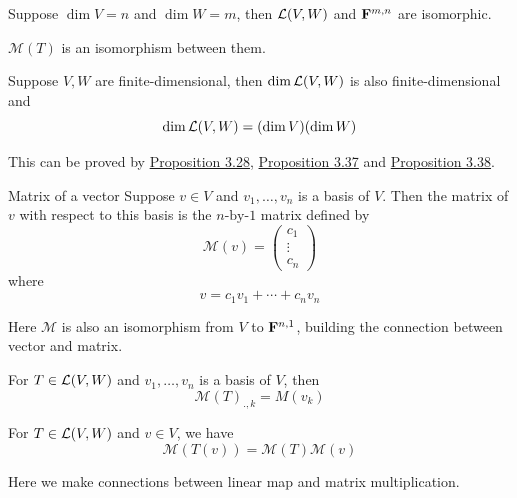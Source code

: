 \documentclass[12pt,a4paper]{article}
\begin{document}
    \begin{prop}\label{3.38}
        Suppose $\dim V=n$ and $\dim W=m$, then $\mathcal{L}(V,W)$ and $\mathbf{F}^{m,n}$ are isomorphic.
    \end{prop}
    \begin{remark}
        $\mathcal{M}(T)$ is an isomorphism between them.
    \end{remark}
    \hfill

    \begin{prop}\label{3.39}
        Suppose $V,W$ are finite-dimensional, then $\dim\mathcal{L}(V,W)$ is also finite-dimensional and 
        $$\dim\mathcal{L}(V,W)=(\dim V)(\dim W)$$
    \end{prop}
    \begin{remark}
        This can be proved by \hyperref[3.28]{Proposition 3.28}, \hyperref[3.37]{Proposition 3.37} and \hyperref[3.38]{Proposition 3.38}.
    \end{remark}
    \hfill

    \begin{defi}{Matrix of a vector}
        Suppose $v\in V$ and $v_1,\dots,v_n$ is a basis of $V$. Then the matrix of $v$ with respect to this basis is the $n\text{-by-}1$ matrix defined by
        $$
        \mathcal{M}(v)=\begin{pmatrix}c_1\\\vdots\\c_n\end{pmatrix}
        $$where
        $$
        v=c_1v_1+\cdots+c_nv_n
        $$
    \end{defi}
    \begin{remark}
        Here $\mathcal{M}$ is also an isomorphism from $V$ to $\mathbf{F}^{n,1}$, building the connection between vector and matrix.
    \end{remark}
    \hfill

    \begin{prop}
        For $T\in\mathcal{L}(V,W)$ and $v_1,\dots,v_n$ is a basis of $V$, then 
        $$
        \mathcal{M}(T)_{.,k}=M(v_k)
        $$
    \end{prop}
    \begin{prop}
        For $T\in\mathcal{L}(V,W)$ and $v\in V$, we have
        $$
        \mathcal{M}(T(v))=\mathcal{M}(T)\mathcal{M}(v)
        $$
    \end{prop}
    \begin{remark}
        Here we make connections between linear map and matrix multiplication.
    \end{remark}
    \hfill
\end{document}
